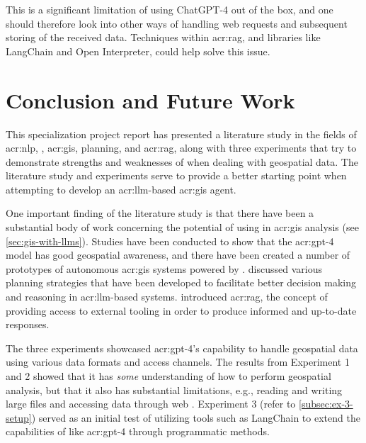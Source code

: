 This is a significant limitation of using ChatGPT-4 out of the box, and one should therefore look into other ways of handling web requests and subsequent storing of the received data. Techniques within \gls{acr:rag}, and libraries like LangChain and Open Interpreter, could help solve this issue.

\glsresetall

\section{Conclusion and Future Work}\label{sec:conclusion-and-future-work}

This specialization project report has presented a literature study in the fields of \acrlong{acr:nlp}, , \acrshort{acr:gis}, planning, and \acrlong{acr:rag}, along with three experiments that try to demonstrate strengths and weaknesses of  when dealing with geospatial data. The literature study and experiments serve to provide a better starting point when attempting to develop an \acrshort{acr:llm}-based \acrshort{acr:gis} agent.

One important finding of the literature study is that there have been a substantial body of work concerning the potential of using  in \acrshort{acr:gis} analysis (see \autoref{sec:gis-with-llms}). Studies have been conducted to show that the \acrshort{acr:gpt}-4 model has good geospatial awareness, and there have been created a number of prototypes of autonomous \acrshort{acr:gis} systems powered by .  discussed various planning strategies that have been developed to facilitate better decision making and reasoning in \acrshort{acr:llm}-based systems.  introduced \gls{acr:rag}, the concept of providing  access to external tooling in order to produce informed and up-to-date responses.

The three experiments showcased \acrshort{acr:gpt}-4's capability to handle geospatial data using various data formats and access channels. The results from Experiment 1 and 2 showed that it has \textit{some} understanding of how to perform geospatial analysis, but that it also has substantial limitations, e.g., reading and writing large files and accessing data through web . Experiment 3 (refer to \autoref{subsec:ex-3-setup}) served as an initial test of utilizing tools such as LangChain to extend the capabilities of  like \acrshort{acr:gpt}-4 through programmatic methods.

